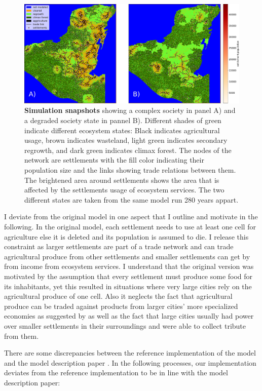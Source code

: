 \begin{figure}[!t]
\centering
\includegraphics[width=\textwidth]{figures/map_plots.pdf}
\caption{\textbf{Simulation snapshots} showing a complex society in panel A) and a degraded society state in pannel B). Different shades of green indicate different ecosystem states: Black indicates agricultural usage, brown indicates wasteland, light green indicates secondary regrowth, and dark green indicates climax forest. The nodes of the network are settlements with the fill color indicating their population size and the links showing trade relations between them. The brightened area around settlements shows the area that is affected by the settlements usage of ecosystem services. The two different states are taken from the same model run 280 years appart.}
\label{fig:model_snapshot}
\end{figure}

I deviate from the original model in one aspect that I outline and motivate in the following.
In the original model, each settlement needs to use at least one cell for agriculture else it is deleted and its population is assumed to die. I release this constraint as larger settlements are part of a trade network and can trade agricultural produce from other settlements and smaller settlements can get by from income from ecosystem services. I understand that the original version was motivated by the assumption that every settlement must produce some food for its inhabitants, yet this resulted in situations where very large cities rely on the agricultural produce of one cell. Also it neglects the fact that agricultural produce can be traded against products from larger cities' more specialized economies as suggested by \cite{Dahlin2007} as well as the fact that large cities usually had power over smaller settlements in their surroundings and were able to collect tribute from them.

There are some discrepancies between the reference implementation of the model \cite{Heckbert2013model} and the model description paper \cite{Heckbert2013}. In the following processes, our implementation deviates from the reference implementation to be in line with the model description paper: 

